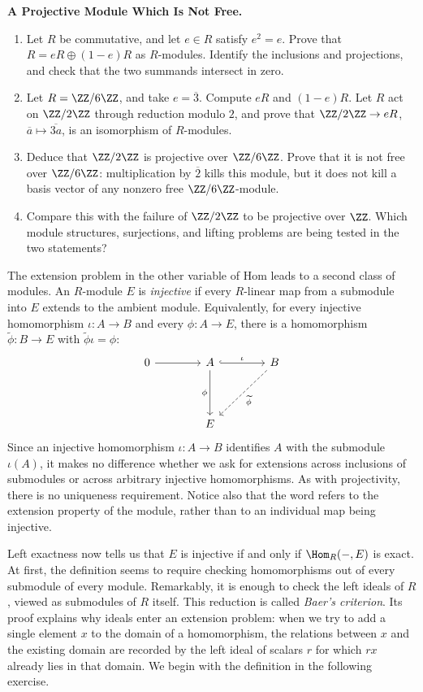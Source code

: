 \documentclass[12pt,reqno]{amsart}
\begin{document}
\hrulefill

\begin{problems}
\item\label{h:idempotent} \textbf{A Projective Module Which Is Not Free.}
\begin{enumerate}
\item Let $R$ be commutative, and let $e\in R$ satisfy $e^2=e$. Prove that $R=eR\oplus(1-e)R$ as $R$-modules. Identify the inclusions and projections, and check that the two summands intersect in zero.
\item Let $R=\ZZ/6\ZZ$, and take $e=\overline3$. Compute $eR$ and $(1-e)R$. Let $R$ act on $\ZZ/2\ZZ$ through reduction modulo $2$, and prove that $\ZZ/2\ZZ\to eR$, $\overline a\mapsto\overline{3a}$, is an isomorphism of $R$-modules.
\item Deduce that $\ZZ/2\ZZ$ is projective over $\ZZ/6\ZZ$. Prove that it is not free over $\ZZ/6\ZZ$: multiplication by $\overline2$ kills this module, but it does not kill a basis vector of any nonzero free $\ZZ/6\ZZ$-module.
\item Compare this with the failure of $\ZZ/2\ZZ$ to be projective over $\ZZ$. Which module structures, surjections, and lifting problems are being tested in the two statements?
\end{enumerate}
\end{problems}

\hrulefill

The extension problem in the other variable of Hom leads to a second class of modules. An $R$-module $E$ is \emph{injective} if every $R$-linear map from a submodule into $E$ extends to the ambient module. Equivalently, for every injective homomorphism $\iota:A\to B$ and every $\phi:A\to E$, there is a homomorphism $\widetilde\phi:B\to E$ with $\widetilde\phi\iota=\phi$:
\[
\begin{tikzcd}[row sep=4em,column sep=4em]
0\arrow[r]&A\arrow[r,hook,"\iota"]\arrow[d,"\phi"']&B\arrow[dl,dashed,"\widetilde\phi"]\\
&E&
\end{tikzcd}
\]
Since an injective homomorphism $\iota:A\to B$ identifies $A$ with the submodule $\iota(A)$, it makes no difference whether we ask for extensions across inclusions of submodules or across arbitrary injective homomorphisms. As with projectivity, there is no uniqueness requirement. Notice also that the word refers to the extension property of the module, rather than to an individual map being injective.

Left exactness now tells us that $E$ is injective if and only if $\Hom_R(-,E)$ is exact. At first, the definition seems to require checking homomorphisms out of every submodule of every module. Remarkably, it is enough to check the left ideals of $R$, viewed as submodules of $R$ itself. This reduction is called \emph{Baer's criterion}. Its proof explains why ideals enter an extension problem: when we try to add a single element $x$ to the domain of a homomorphism, the relations between $x$ and the existing domain are recorded by the left ideal of scalars $r$ for which $rx$ already lies in that domain. We begin with the definition in the following exercise.
\end{document}
